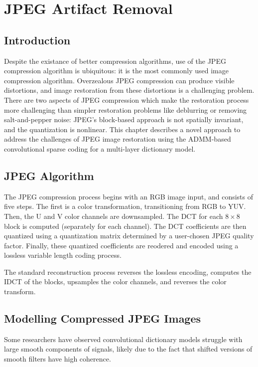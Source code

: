 \chapter{JPEG Artifact Removal}
\section{Introduction}
Despite the existance of better compression algorithms, use of the JPEG compression algorithm is ubiquitous: it is the most commonly used image compression algorithm.  Overzealous JPEG compression can produce visible distortions, and image restoration from these distortions is a challenging problem. There are two aspects of JPEG compression which make the restoration process more challenging than simpler restoration problems like deblurring or removing salt-and-pepper noise: JPEG's block-based approach is not spatially invariant, and the quantization is nonlinear. This chapter describes a novel approach to address the challenges of JPEG image restoration using the ADMM-based convolutional sparse coding for a multi-layer dictionary model.
\section{JPEG Algorithm}

The JPEG compression process begins with an RGB image input, and consists of five steps. The first is a color transformation, transitioning from RGB to YUV. Then, the U and V color channels are downsampled.  The DCT for each $8 \times 8$ block is computed (separately for each channel).  The DCT coefficients are then quantized using a quantization matrix determined by a user-chosen JPEG quality factor. Finally, these quantized coefficients are reodered and encoded using a lossless variable length coding process.

The standard reconstruction process reverses the lossless encoding, computes the IDCT of the blocks, upsamples the color channels, and reverses the color transform.
\section{Modelling Compressed JPEG Images}
Some researchers have observed convolutional dictionary models struggle with large smooth components of signals, likely due to the fact that shifted versions of smooth filters have high coherence.

